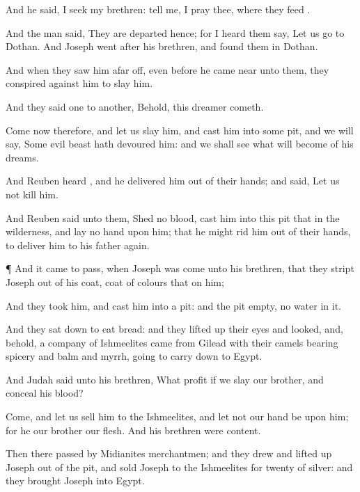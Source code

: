 {And he
said, I
seek my
brethren:
tell me, I pray thee,
where they
feed
{}.

And the
man
said, They are
departed
hence; for I
heard them
say, Let us
go to
Dothan. And
Joseph
went
after his
brethren, and
found them in
Dothan.

And when they
saw him afar
off, even before he came
near unto them, they
conspired against him to
slay him.

And they
said
one to
another, Behold,
this
dreamer
cometh.

Come now therefore, and let us
slay him, and
cast him into
some
pit, and we will
say, Some
evil
beast hath
devoured him: and we shall
see what will become of his
dreams.

And
Reuben
heard
{}, and he
delivered him out of their
hands; and
said, Let us not
kill him.

And
Reuben
said unto them,
Shed no
blood,
{}
cast him into this
pit that
{} in the
wilderness, and
lay no
hand upon him; that he might
rid him out of their
hands, to
deliver him to his
father
again.


\par }{\PP {}¶ And it came to pass, when
Joseph was
come unto his
brethren, that they
stript
Joseph out
of his
coat,
{}
coat of
{}
colours that
{} on him;

And they
took him, and
cast him into a
pit: and the
pit
{}
empty,
{} no
water in it.

And they sat
down to
eat
bread: and they lifted
up their
eyes and
looked, and, behold, a
company of
Ishmeelites
came from
Gilead with their
camels
bearing
spicery and
balm and
myrrh,
going to carry
{}
down to
Egypt.

And
Judah
said unto his
brethren, What
profit
{} if we
slay our
brother, and
conceal his
blood?

Come, and let us
sell him to the
Ishmeelites, and let not our
hand be upon him; for he
{} our
brother
{} our
flesh. And his
brethren were
content.

Then there
passed by
Midianites
merchantmen; and they
drew and lifted
up
Joseph out of the
pit, and
sold
Joseph to the
Ishmeelites for
twenty
{} of
silver: and they
brought
Joseph into
Egypt.


}
